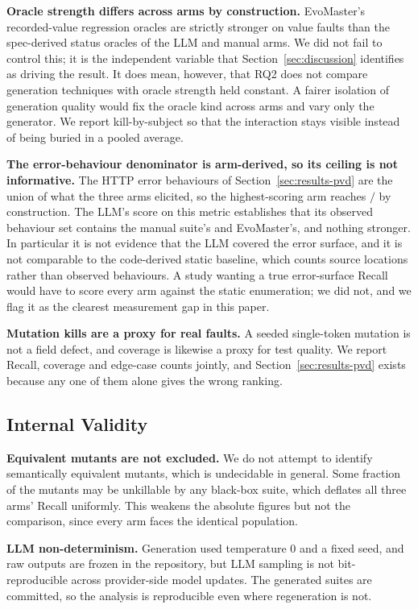 \textbf{Oracle strength differs across arms by construction.} EvoMaster's recorded-value
regression oracles are strictly stronger on value faults than the spec-derived status oracles
of the LLM and manual arms. We did not fail to control this; it is the independent variable
that Section~\ref{sec:discussion} identifies as driving the result. It does mean, however, that
RQ2 does not compare generation techniques with oracle strength held constant. A fairer
isolation of generation quality would fix the oracle kind across arms and vary only the
generator. We report kill-by-subject so that the interaction stays visible instead of being
buried in a pooled average.

\textbf{The error-behaviour denominator is arm-derived, so its ceiling is not informative.}
The \PDerrKey{} HTTP error behaviours of Section~\ref{sec:results-pvd} are the union of what
the three arms elicited, so the highest-scoring arm reaches \PDerrKey{}$/$\PDerrKey{} by
construction. The LLM's score on this metric establishes that its observed behaviour set
contains the manual suite's and EvoMaster's, and nothing stronger. In particular it is not
evidence that the LLM covered the error surface, and it is not comparable to the code-derived
static baseline, which counts source locations rather than observed behaviours. A study
wanting a true error-surface Recall would have to score every arm against the static
enumeration; we did not, and we flag it as the clearest measurement gap in this paper.

\textbf{Mutation kills are a proxy for real faults.} A seeded single-token mutation is not a
field defect, and coverage is likewise a proxy for test quality. We report Recall, coverage
and edge-case counts jointly, and Section~\ref{sec:results-pvd} exists because any one of them
alone gives the wrong ranking.

\subsection{Internal Validity}

\textbf{Equivalent mutants are not excluded.} We do not attempt to identify semantically
equivalent mutants, which is undecidable in general. Some fraction of the \RQIIn{} mutants may
be unkillable by any black-box suite, which deflates all three arms' Recall uniformly. This
weakens the absolute figures but not the comparison, since every arm faces the identical
population.

\textbf{LLM non-determinism.} Generation used temperature 0 and a fixed seed, and raw outputs
are frozen in the repository, but LLM sampling is not bit-reproducible across provider-side
model updates. The generated suites are committed, so the analysis is reproducible even where
regeneration is not.

